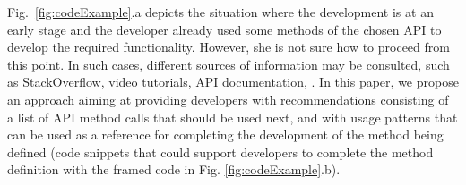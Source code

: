 Fig.~\ref{fig:codeExample}.a depicts the situation where the development 
is at an early stage and the developer already used some methods of the chosen 
API to develop the required functionality. However, she is not sure how to 
proceed from this point. In such cases, different sources of information 
may be consulted, such as StackOverflow, video tutorials, API 
documentation, \etc. In this paper, we propose an approach aiming at providing 
developers with recommendations consisting of a list of API method 
calls that should be used next, and with usage patterns that can be used as a 
reference for completing the development of the method being defined (\eg code 
snippets that could support developers to complete the method definition with 
the framed code in Fig. \ref{fig:codeExample}.b).
